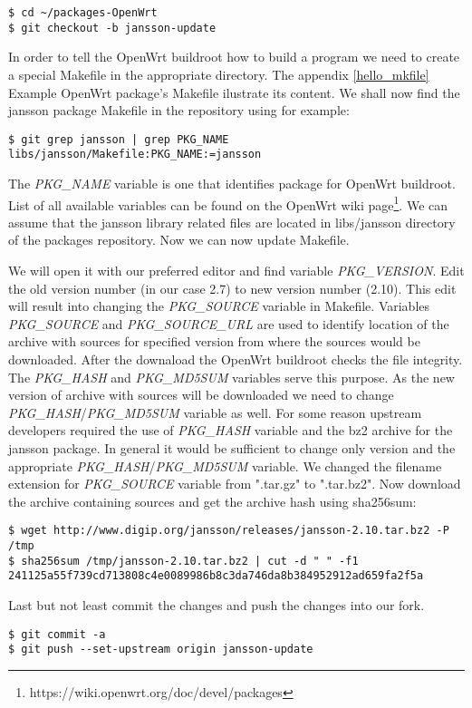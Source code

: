 \begin{lstlisting}[columns=fixed,basicstyle=\ttfamily\footnotesize,tabsize=4,backgroundcolor=\color{yellow!10}]
$ cd ~/packages-OpenWrt
$ git checkout -b jansson-update
\end{lstlisting}
In order to tell the OpenWrt buildroot how to build a program we need to create a special Makefile in the appropriate directory.
The appendix \ref{hello_mkfile} Example OpenWrt package's Makefile ilustrate its content.
We shall now find the jansson package Makefile in the repository using for example:
\begin{lstlisting}[columns=fixed,basicstyle=\ttfamily\footnotesize,tabsize=4,backgroundcolor=\color{yellow!10}]
$ git grep jansson | grep PKG_NAME
libs/jansson/Makefile:PKG_NAME:=jansson
\end{lstlisting}
The {\it PKG\_NAME} variable is one that identifies package for OpenWrt buildroot\cite{creating_pkgs}.
List of all available variables can be found on the OpenWrt wiki page\footnote{https://wiki.openwrt.org/doc/devel/packages}.
We can assume that the jansson library related files are located in libs/jansson directory of the packages repository.
Now we can now update Makefile.

We will open it with our preferred editor and find variable {\it PKG\_VERSION}.
Edit the old version number (in our case 2.7) to new version number (2.10).
This edit will result into changing the {\it PKG\_SOURCE} variable in Makefile.
Variables {\it PKG\_SOURCE} and {\it PKG\_SOURCE\_URL} are used to identify location of the archive with sources for specified version from where the sources would be downloaded.
After the downaload the OpenWrt buildroot checks the file integrity.
The {\it PKG\_HASH} and {\it PKG\_MD5SUM} variables serve this purpose.
As the new version of archive with sources will be downloaded we need to change {\it PKG\_HASH}/{\it PKG\_MD5SUM} variable as well.
For some reason upstream developers required the use of {\it PKG\_HASH} variable and the bz2 archive for the jansson package.
In general it would be sufficient to change only version and the appropriate {\it PKG\_HASH}/{\it PKG\_MD5SUM} variable.
We changed the filename extension for {\it PKG\_SOURCE} variable from ".tar.gz" to ".tar.bz2".
Now download the archive containing sources and get the archive hash using sha256sum:
\begin{lstlisting}[columns=fixed,basicstyle=\ttfamily\footnotesize,tabsize=4,backgroundcolor=\color{yellow!10}]
$ wget http://www.digip.org/jansson/releases/jansson-2.10.tar.bz2 -P /tmp
$ sha256sum /tmp/jansson-2.10.tar.bz2 | cut -d " " -f1
241125a55f739cd713808c4e0089986b8c3da746da8b384952912ad659fa2f5a
\end{lstlisting}
Last but not least commit the changes and push the changes into our fork.
\begin{lstlisting}[columns=fixed,basicstyle=\ttfamily\footnotesize,tabsize=4,backgroundcolor=\color{yellow!10}]
$ git commit -a
$ git push --set-upstream origin jansson-update
\end{lstlisting}

